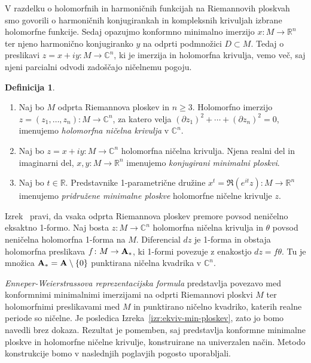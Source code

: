 \documentclass[12pt,a4paper,twoside]{article}
\theoremstyle{definition} %
\newtheorem{definicija}{Definicija}[section]
\theoremstyle{plain} %
\numberwithin{equation}{section}  %
\newcommand{\R}{\mathbb R}
\newcommand{\C}{\mathbb C}
\begin{document}
V razdelku o holomorfnih in harmoničnih funkcijah na Riemannovih ploskvah smo govorili o harmoničnih konjugirankah in kompleksnih krivuljah izbrane holomorfne funkcije. Sedaj opazujmo konformno minimalno imerzijo $x \colon M \to \mathbb{R}^{n}$ ter njeno harmonično konjugiranko $y$ na odprti podmnožici $D \subset M$. Tedaj o preslikavi $z = x + iy \colon M \to \mathbb{C}^{n}$, ki je imerzija in holomorfna krivulja, vemo več, saj njeni parcialni odvodi zadoščajo ničelnemu pogoju.
%
\begin{definicija}
\begin{enumerate}
\item
Naj bo $M$ odprta Riemannova ploskev in $n \geq 3$. Holomorfno imerzijo $z = (z_{1}, \dots , z_{n}) \colon M \to \C^{n}$, za katero velja
$(\partial{z_{1}})^2 + \cdots + (\partial{z_{n}})^2 = 0$, imenujemo \emph{holomorfna ničelna krivulja} v $\C^{n}$.
\item
Naj bo $z = x + iy \colon M \to \C^{n}$ holomorfna ničelna krivulja. Njena realni del in imaginarni del, $x, y \colon M \to \R^{n}$ imenujemo \emph{konjugirani minimalni ploskvi}.
\item
Naj bo $t \in \R$. Predstavnike 1-parametrične družine $x^{t} = \Re{(e^{it} z)} \colon M \to \R^{n}$ imenujemo \emph{pridružene minimalne ploskve} holomorfne ničelne krivulje $z$.
\end{enumerate}
\end{definicija}

Izrek~\cite[Theorem~1.10.5]{alarcon2021minimal} pravi, da vsaka odprta Riemannova ploskev premore povsod neničelno eksaktno 1-formo.
Naj bosta $z \colon M \to \mathbb{C}^{n}$ holomorfna ničelna krivulja in $\theta$ povsod neničelna holomorfna 1-forma na $M$. Diferencial $dz$ je 1-forma in obstaja holomorfna preslikava $f \colon M \to \textbf{\textup{A}}_{*}$, ki 1-formi povezuje z enakostjo $dz = f \theta$. Tu je množica $\textbf{\textup{A}}_{*} = \textbf{\textup{A}} \setminus \{0\}$ punktirana ničelna kvadrika v $\mathbb{C}^{n}$.

\emph{Enneper-Weierstrassova reprezentacijska formula} predstavlja povezavo med konformnimi minimalnimi imerzijami na odprti Riemannovi ploskvi $M$ ter holomorfnimi preslikavami med $M$ in punktirano ničelno kvadriko, katerih realne periode so ničelne. Je posledica Izreka~\ref{izr:ekviv-min-ploskev}, zato jo bomo navedli brez dokaza. Rezultat je pomemben, saj predstavlja konformne minimalne ploskve in holomorfne ničelne krivulje, konstruirane na univerzalen način. Metodo konstrukcije bomo v naslednjih poglavjih pogosto uporabljali.
\end{document}
